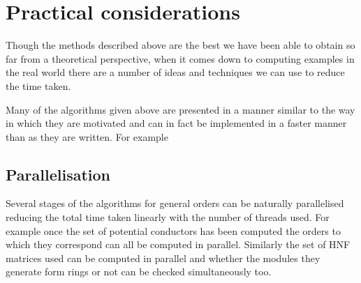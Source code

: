 \documentclass[12pt,a4paper,abstracton,bibtotoc]{scrreprt}
\theoremstyle{definition}
\newtheorem{alg}{Algorithm}
\renewcommand{\O}{\mathcal{O}}
\begin{document}



\section{Practical considerations}
Though the methods described above are the best we have been able to obtain so far from a theoretical perspective, when it comes down to computing examples in the real world there are a number of ideas and techniques we can use to reduce the time taken.

Many of the algorithms given above are presented in a manner similar to the way in which they are motivated and can in fact be implemented in a faster manner than as they are written.
For example %

\subsection{Parallelisation}
Several stages of the algorithms for general orders can be naturally parallelised reducing the total time taken linearly with the number of threads used.
For example once the set of potential conductors has been computed the orders to which they correspond can all be computed in parallel.
Similarly the set of HNF matrices used can be computed in parallel and whether the modules they generate form rings or not can be checked simultaneously too.
\end{document}
